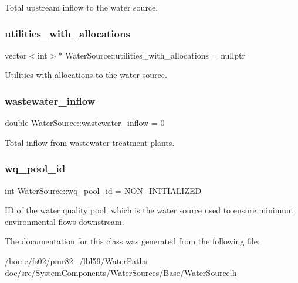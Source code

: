Total upstream inflow to the water source. 

\mbox{\label{classWaterSource_ac345583fc2d0f7e1db31ee40244d7ace}} 
\subsubsection{\texorpdfstring{utilities\+\_\+with\+\_\+allocations}{utilities\_with\_allocations}}
{\footnotesize\ttfamily vector$<$int$>$$\ast$ Water\+Source\+::utilities\+\_\+with\+\_\+allocations = nullptr\hspace{0.3cm}{\ttfamily [protected]}}



Utilities with allocations to the water source. 

\mbox{\label{classWaterSource_aeb5a2d2d83383a70ca20f3e94635a9c7}} 
\subsubsection{\texorpdfstring{wastewater\+\_\+inflow}{wastewater\_inflow}}
{\footnotesize\ttfamily double Water\+Source\+::wastewater\+\_\+inflow = 0\hspace{0.3cm}{\ttfamily [protected]}}



Total inflow from wastewater treatment plants. 

\mbox{\label{classWaterSource_acef73d9b1675fb6db9ec39347514db6d}} 
\subsubsection{\texorpdfstring{wq\+\_\+pool\+\_\+id}{wq\_pool\_id}}
{\footnotesize\ttfamily int Water\+Source\+::wq\+\_\+pool\+\_\+id = N\+O\+N\+\_\+\+I\+N\+I\+T\+I\+A\+L\+I\+Z\+ED\hspace{0.3cm}{\ttfamily [protected]}}



ID of the water quality pool, which is the water source used to ensure minimum environmental flows downstream. 



The documentation for this class was generated from the following file\+:\begin{DoxyCompactItemize}
\item 
/home/fs02/pmr82\+\_/lbl59/\+Water\+Paths-\/doc/src/\+System\+Components/\+Water\+Sources/\+Base/\mbox{\hyperlink{WaterSource_8h}{Water\+Source.\+h}}\end{DoxyCompactItemize}
